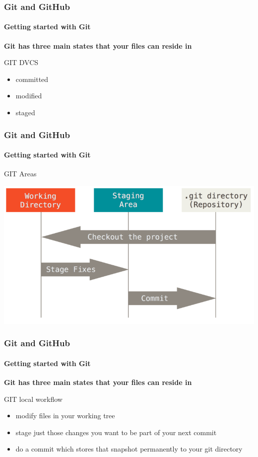 \begin{frame}
    \frametitle{Git and GitHub}
    \framesubtitle{Getting started with Git}
    \addtocounter{nframe}{1}
    
    \textbf{Git has three main states that your files can reside in}

    \begin{block}{GIT DVCS}
       \begin{itemize}
           \item committed
           \item modified 
           \item staged
       \end{itemize}
    
    \end{block}

\end{frame}

\begin{frame}
    \frametitle{Git and GitHub}
    \framesubtitle{Getting started with Git}
    \addtocounter{nframe}{1}
    
    \begin{block}{GIT Areas}
        \begin{center}

            \includegraphics[width=.7\textwidth]{imgs/git-areas.png}
    
        \end{center}
    
    \end{block}
    

\end{frame}

\begin{frame}
    \frametitle{Git and GitHub}
    \framesubtitle{Getting started with Git}
    \addtocounter{nframe}{1}
    
    \textbf{Git has three main states that your files can reside in}

    \begin{block}{GIT local workflow}
       \begin{itemize}
           \item modify files in your working tree
           \item stage just those changes you want to be part of your next commit 
           \item do a commit which stores that snapshot permanently to your git directory
       \end{itemize}
    
    \end{block}

\end{frame}
